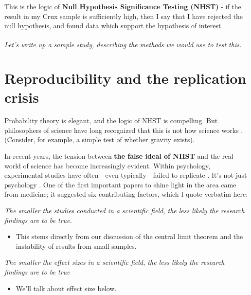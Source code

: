\documentclass[]{book}
\providecommand{\tightlist}{%
  \setlength{\itemsep}{0pt}\setlength{\parskip}{0pt}}
\let\oldsubparagraph\subparagraph
\renewcommand{\subparagraph}[1]{\oldsubparagraph{#1}\mbox{}}
\theoremstyle{definition}
\theoremstyle{definition}
\theoremstyle{definition}
\theoremstyle{remark}
\begin{document}
This is the logic of \textbf{Null Hypothesis Significance Testing
(NHST)} - if the result in my Crux sample is sufficiently high, then I
say that I have rejected the null hypothesis, and found data which
support the hypothesis of interest.

\subparagraph{\texorpdfstring{\emph{Let's write up a sample study,
describing the methods we would use to test
this.}}{Let's write up a sample study, describing the methods we would use to test this.}}\label{lets-write-up-a-sample-study-describing-the-methods-we-would-use-to-test-this.}

\chapter{Reproducibility and the replication
crisis}\label{reproducibility-and-the-replication-crisis}

Probability theory is elegant, and the logic of NHST is compelling. But
philosophers of science have long recognized that this is not how
science works \citep{lakatos1969falsification}. (Consider, for example,
a simple test of whether gravity exists).

In recent years, the tension between \textbf{the false ideal of NHST}
and the real world of science has become increasingly evident. Within
psychology, experimental studies have often - even typically - failed to
replicate \citep{open2015estimating}. It's not just psychology
\citep{baker2016reproducibility}. One of the first important papers to
shine light in the area \citep{ioannidis2005most} came from medicine; it
suggested six contributing factors, which I quote verbatim here:

\emph{The smaller the studies conducted in a scientific field, the less
likely the research findings are to be true.}

\begin{itemize}
\tightlist
\item
  This stems directly from our discussion of the central limit theorem
  and the instability of results from small samples.
\end{itemize}

\emph{The smaller the effect sizes in a scientific field, the less
likely the research findings are to be true}

\begin{itemize}
\tightlist
\item
  We'll talk about effect size below.
\end{itemize}
\end{document}
